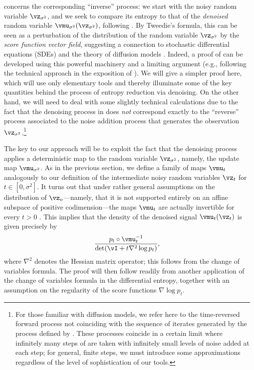 \documentclass[../../book-main.tex]{subfiles}
\begin{document}
 concerns the corresponding ``inverse''
process: we start with the noisy random variable $\vz_{\sigma^2}$, and we seek to
compare its entropy to that of the \textit{denoised} random variable
$\vmu_{\sigma^2}(\vz_{\sigma^2})$, following .
By Tweedie's formula, this can be seen as a perturbation of the distribution of
the random variable $\vz_{\sigma^2}$ by the \textit{score function vector field},
suggesting
a connection to stochastic differential equations (SDEs) and the theory of
diffusion models \cite{song2020score}.
Indeed, a proof of
 can be developed using this powerful
machinery and a limiting argument (e.g., following
the technical approach in the exposition of \cite{DBLP:conf/iclr/ChenC0LSZ23}).
We will give a simpler proof here, which will use only elementary tools and 
thereby illuminate some of the key quantities behind the process of entropy
reduction via denoising.
On the other hand, we will need to deal with some slightly technical
calculations due to the fact that the denoising process in
 does \textit{not} correspond exactly to
the ``reverse'' process associated to the noise addition process that generates
the observation $\vz_{\sigma^2}$.\footnote{For those familiar with diffusion
models, we refer here to the time-reversed forward process not coinciding with
the sequence of iterates generated by the process defined by
. These processes coincide in a certain
limit where infinitely many steps of  are
taken with infinitely small levels of noise added at each step; for general,
finite steps, we must introduce some approximations regardless of the level of
sophistication of our tools.}

The key to our approach will be to exploit the fact that the denoising process
applies a deterministic map to the random variable $\vz_{\sigma^2}$, namely, the
update map $\vmu_{\sigma^2}$. As in the previous section, we define a family of
maps $\vmu_t$ analogously to our definition of the intermediate noisy random
variables $\vz_t$ for $t \in [0, \sigma^2]$.
It turns out that under rather general assumptions on the distribution of
$\vz_o$---namely, that it is not supported entirely on an affine subspace of
positive codimension---the maps $\vmu_t$ are actually invertible for every
$t>0$ \cite[Lemma II.1]{Gribonval2011-pf}.
This implies that the density of the denoised signal $\vmu_t(\vz_t)$ is given
precisely by
\begin{equation*}
  \frac{p_t \circ \vmu_t^{-1}}{\det(\vI + t \nabla^2 \log p_t)},
\end{equation*}
where $\nabla^2$ denotes the Hessian matrix operator; this follows from the
change of variables formula.
The proof will then follow readily from another application of the change of
variables formula in the differential entropy, together with an assumption on
the regularity of the score functions $\nabla \log p_t$.
\end{document}
